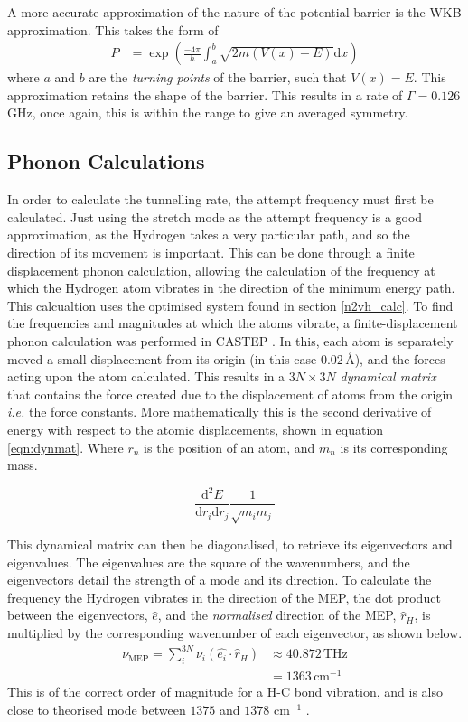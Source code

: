 \documentclass[10pt,a4paper,twocolumn,twoside]{extarticle}
\renewcommand{\d}{\text{d}}
\begin{document}
A more accurate approximation of the nature of the potential barrier is the WKB approximation. This takes the form of 
\begin{align}
    P &= \exp(\frac{-4\pi}{h}\int_{a}^{b}\sqrt{2m(V(x)-E)}{\d}x)
\end{align}
where $a$ and $b$ are the \emph{turning points} of the barrier, such that $V(x) = E$. This approximation retains the shape of the barrier. This results in a rate of $\Gamma = 0.126$\,GHz, once again, this is within the range to give an averaged symmetry. 


\subsection{Phonon Calculations}
\label{phonon}
In order to calculate the tunnelling rate, the attempt frequency must first be calculated. Just using the stretch mode as the attempt frequency is a good approximation, as the Hydrogen takes a very particular path, and so the direction of its movement is important. This can be done through a finite displacement phonon calculation, allowing the calculation of the frequency at which the Hydrogen atom vibrates in the direction of the minimum energy path. This calcualtion uses the optimised system found in section \ref{n2vh_calc}. To find the frequencies and magnitudes at which the atoms vibrate, a finite-displacement phonon calculation was performed in CASTEP \cite{DynamicalMatrix}. In this, each atom is separately moved a small displacement from its origin (in this case $0.02$\,{\AA}), and the forces acting upon the atom calculated. This results in a $3N\times3N$ \emph{dynamical matrix} that contains the force created due to the displacement of atoms from the origin \emph{i.e.} the force constants. More mathematically this is the second derivative of energy with respect to the atomic displacements, shown in equation \ref{eqn:dynmat}. Where $r_n$ is the position of an atom, and $m_n$ is its corresponding mass.

\begin{equation}
	\label{eqn:dynmat}
	\frac{\d^2E}{ {\d}r_i {\d}r_j} \frac{1}{\sqrt{m_i m_j}}
\end{equation}



This dynamical matrix can then be diagonalised, to retrieve its eigenvectors and eigenvalues. The eigenvalues are the square of the wavenumbers, and the eigenvectors detail the strength of a mode and its direction. To calculate the frequency the Hydrogen vibrates in the direction of the MEP, the dot product between the eigenvectors, $\hat{e}$, and the \emph{normalised} direction of the MEP, $\hat{r}_H$, is multiplied by the corresponding wavenumber of each eigenvector, as shown below. 
\begin{align}
    \nu_{\text{MEP}} = \sum_{i}^{3N} \nu_i (\hat{e_i} \cdot \hat{r}_H) &\approx 40.872\,\text{THz}\\ 
	&= 1363\,\text{cm}^{-1} \nonumber
\end{align}
This is of the correct order of magnitude for a H-C bond vibration, and is also close to theorised mode between $1375$ and $1378$ cm$^{-1}$ \cite{Peaker,Hartland}.
\end{document}
